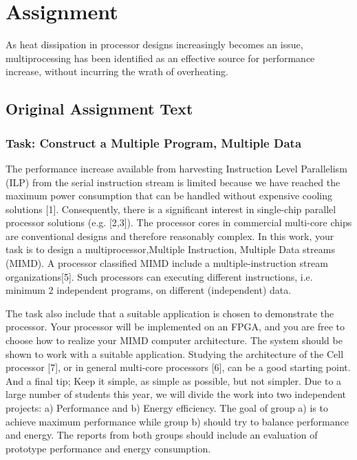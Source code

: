 \section{Assignment}
As heat dissipation in processor designs increasingly becomes an issue, multiprocessing has been identified as an effective source for performance increase, without incurring the wrath of overheating.

\subsection{Original Assignment Text}

\subsubsection{Task: Construct a Multiple Program, Multiple Data}
The performance increase available from harvesting Instruction Level Parallelism (ILP) from the serial 
instruction stream is limited because we have reached the maximum power consumption that can be 
handled without expensive cooling solutions [1]. Consequently, there is a significant interest in 
single-chip parallel processor solutions (e.g. [2,3]). The processor cores in commercial multi-core 
chips are conventional designs and therefore reasonably complex. In this work, your task is to design 
a multiprocessor,Multiple Instruction, Multiple Data streams (MIMD). A processor classified MIMD 
include a multiple-instruction stream organizations[5]. Such processors can executing different 
instructions, i.e. minimum 2 independent programs, on different (independent) data. 
 
The task also include that a suitable application is chosen to demonstrate the processor. 
Your processor will be implemented on an FPGA, and you are free to choose how to realize your  
MIMD  computer  architecture.  The system should  be shown to work with  a suitable  application. 
Studying the architecture of the Cell processor [7], or in general multi-core processors [6], can be a 
good starting point. And a final tip; Keep it simple, as simple as possible, but not simpler. 
Due to a large number of students this year, we will divide the work into two independent projects: 
a) Performance and b) Energy efficiency. The goal of group a) is to achieve maximum performance 
while group b) should try to balance performance and energy. The reports from both groups should 
include an evaluation of prototype performance and energy consumption. 

